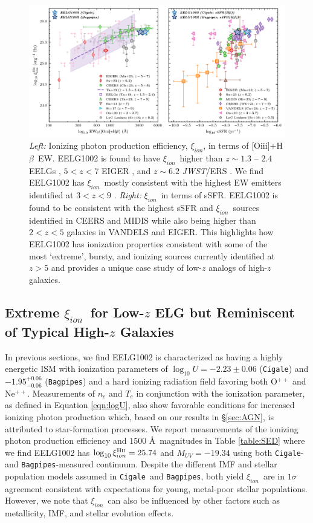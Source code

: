\documentclass[twocolumn,tight,times,linenumbers]{aastex631}
\newcommand{\hbeta}{H$\beta$}
\newcommand{\oiii}{[O{\sc iii}]}
\newcommand{\xiion}{$\xi_{ion}$}
\newcommand{\xiionHtwo}{$\xi_{ion}^\textrm{H{\sc ii}}$}
\newcommand{\cigale}{\texttt{Cigale}}
\newcommand{\bagpipes}{\texttt{Bagpipes}}
\begin{document}
		\begin{figure}
			\centering
			\includegraphics[width=\textwidth]{figures/xi_ion_O3HB_EW_sSFR.png}
			\caption{\textit{Left:} Ionizing photon production efficiency, \xiion, in terms of \oiii+\hbeta~EW. EELG1002 is found to have \xiion~higher than $z \sim 1.3$ -- $2.4$ EELGs \citep{Tang2019}, $5 < z < 7$ EIGER \citep{Matthee2023}, and $z \sim 6.2$ \textit{JWST}/ERS \citep{Sun2023}. We find EELG1002 has \xiion~mostly consistent with the highest EW emitters identified at $3 < z < 9$ \citep{Stark2017,Onodera2020,Endsley2021,Tang2023,Chen2024}. \textit{Right:} \xiion~in terms of sSFR. EELG1002 is found to be consistent with the highest sSFR and \xiion~sources identified in CEERS \citep{Whitler2024} and MIDIS \citep{Rinaldi2023} while also being higher than $2 < z< 5$ galaxies in VANDELS \citep{Castellano2023} and EIGER. This highlights how EELG1002 has ionization properties consistent with some of the most `extreme', bursty, and ionizing sources currently identified at $z > 5$ and provides a unique case study of low-$z$ analogs of high-$z$ galaxies.}
			\label{fig:xi_ion}
		\end{figure}
		
		\subsection{Extreme \xiion~for Low-$z$ ELG but Reminiscent of Typical High-$z$ Galaxies}

		
		In previous sections, we find EELG1002 is characterized as having a highly energetic ISM with ionization parameters of $\log_{10} U = -2.23\pm0.06$ (\cigale) and $-1.95^{+0.06}_{-0.06}$ (\bagpipes) and a hard ionizing radiation field favoring both O$^{++}$ and Ne$^{++}$. Measurements of $n_e$ and $T_e$ in conjunction with the ionization parameter, as defined in Equation \ref{eqn:logU}, also show favorable conditions for increased ionizing photon production which, based on our results in \S\ref{sec:AGN}, is attributed to star-formation processes. We report measurements of the ionizing photon production efficiency and $1500$ \AA~magnitudes in Table \ref{table:SED} where we find EELG1002 has $\log_{10}\textrm{\xiionHtwo} = 25.74$ and $M_{UV} = -19.34$ using both \cigale- and \bagpipes-measured continuum. Despite the different IMF and stellar population models assumed in \cigale~and \bagpipes, both yield \xiion~are in $1\sigma$ agreement consistent with expectations for young, metal-poor stellar populations. However, we note that \xiion~can also be influenced by other factors such as metallicity, IMF, and stellar evolution effects.
	
\end{document}
